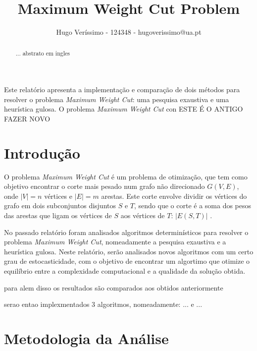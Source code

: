 \documentclass[mirror, portugues]{revdetua}
\begin{document}

\title{Maximum Weight Cut Problem}
\author{Hugo Veríssimo - 124348 - hugoverissimo@ua.pt}
\maketitle

\begin{abstract}
... abstrato em ingles
\end{abstract}

\begin{resumo}
Este relatório apresenta a implementação e comparação de dois métodos para resolver o problema \textit{Maximum Weight Cut}: uma pesquisa exaustiva e uma heurística gulosa. O problema \textit{Maximum Weight Cut} con ESTE É O ANTIGO FAZER NOVO
\end{resumo}

\section{Introdução}

O problema \textit{Maximum Weight Cut} é um problema de otimização, que tem como objetivo encontrar o corte mais pesado num grafo não direcionado $G(V,E)$, onde $|V| = n$ vértices e $|E| = m$ arestas. Este corte envolve dividir os vértices do grafo em dois subconjuntos disjuntos $S$ e $T$, sendo que o corte é a soma dos pesos das arestas que ligam os vértices de $S$ aos vértices de $T$: $|E(S, T)|$ \cite{AG14}.

No passado relatório foram analisados algoritmos determinísticos para resolver o problema \textit{Maximum Weight Cut}, nomeadamente a pesquisa exaustiva e a heurística gulosa. Neste relatório, serão analisados novos algoritmos com um certo grau de estocasticidade, com o objetivo de encontrar um algortimo que otimize o equilíbrio entre a complexidade computacional e a qualidade da solução obtida.

para alem disso os resultados são comparados aos obtidos anteriormente

serao entao implexmentados 3 algoritmos, nomeadamente: ... e ...

\section{Metodologia da Análise}
\end{document}
